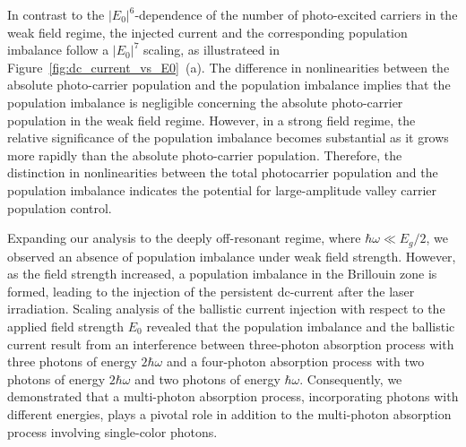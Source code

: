 In contrast to the $|E_0|^6$-dependence of the number of photo-excited carriers in the weak field regime, the injected current and the corresponding population imbalance follow a $|E_0|^7$ scaling, as illustrateed in Figure~\ref{fig:dc_current_vs_E0}~(a). The difference in nonlinearities between the absolute photo-carrier population and the population imbalance implies that the population imbalance is negligible concerning the absolute photo-carrier population in the weak field regime. However, in a strong field regime, the relative significance of the population imbalance becomes substantial as it grows more rapidly than the absolute photo-carrier population. Therefore, the distinction in nonlinearities between the total photocarrier population and the population imbalance indicates the potential for large-amplitude valley carrier population control.

Expanding our analysis to the deeply off-resonant regime, where $\hbar \omega \ll E_g/2$, we observed an absence of population imbalance under weak field strength. However, as the field strength increased, a population imbalance in the Brillouin zone is formed, leading to the injection of the persistent dc-current after the laser irradiation. Scaling analysis of the ballistic current injection with respect to the applied field strength $E_0$ revealed that the population imbalance and the ballistic current result from an interference between three-photon absorption process with three photons of energy $2\hbar \omega$ and a four-photon absorption process with two photons of energy $2\hbar \omega$ and two photons of energy $\hbar \omega$. Consequently, we demonstrated that a multi-photon absorption process, incorporating photons with different energies, plays a pivotal role in addition to the multi-photon absorption process involving single-color photons.



